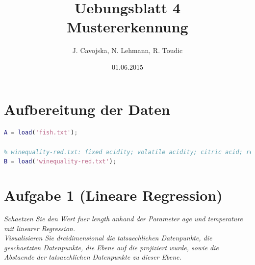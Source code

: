 \documentclass[12pt]{article}
\title{Uebungsblatt 4\\ \glqq Mustererkennung\grqq}
\author{J. Cavojska, N. Lehmann, R. Toudic}
\date{01.06.2015}
\begin{document}
\maketitle
\tableofcontents
\newpage

\section{Aufbereitung der Daten}
\begin{lstlisting}[language=Matlab]
% fish.txt: index; the age of the fish; the water temperature in Celsius; the length of the fish
A = load('fish.txt');

% winequality-red.txt: fixed acidity; volatile acidity; citric acid; residual sugar; chlorides; free sulfur dioxide; total sulfur; dioxide; density; pH; sulphates; alcohol; quality (score between 0 and 10) 
B = load('winequality-red.txt');
\end{lstlisting}
\newpage

\section{Aufgabe 1 (Lineare Regression)}
\textit{Schaetzen Sie den Wert fuer length anhand der Parameter age und temperature mit linearer Regression.\\
Visualisieren Sie dreidimensional die tatsaechlichen Datenpunkte, die geschaetzten Datenpunkte, die Ebene auf die projiziert wurde, sowie die Abstaende der tatsaechlichen Datenpunkte zu dieser Ebene.}
\end{document}
